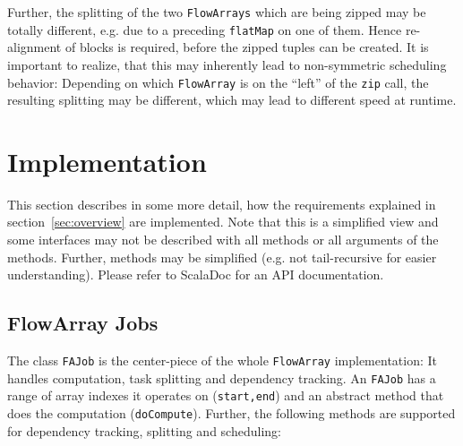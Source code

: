 \documentclass[runningheads,a4paper,fleqn]{llncs}
\begin{document}
Further, the splitting of the two \texttt{FlowArrays} which are being zipped
may be totally different, e.g. due to a preceding \texttt{flatMap} on
one of them. Hence re-alignment of blocks is required,
before the zipped tuples can be created. It is important to realize,
that this may inherently lead to non-symmetric scheduling behavior:
Depending on which \texttt{FlowArray} is on the ``left'' of the \texttt{zip}
call, the resulting splitting may be different, which may lead to
different speed at runtime. 

\section{Implementation}
\label{sec:implementation}

This section describes in some more detail, how the requirements
explained in section~\ref{sec:overview} are implemented. Note that
this is a simplified view and some interfaces may not be described
with all methods or all arguments of the methods. Further, methods may
be simplified (e.g. not tail-recursive for easier
understanding). Please refer to ScalaDoc for an API documentation.

\subsection{FlowArray Jobs}
The class \texttt{FAJob} is the center-piece of the whole \texttt{FlowArray}
implementation: It handles computation, task splitting and dependency
tracking. An \texttt{FAJob} has a range of array indexes it operates
on
(\texttt{start,end}) and an abstract method that does the computation
(\texttt{doCompute}). Further, the following methods are supported for
dependency tracking, splitting and scheduling:
\end{document}
